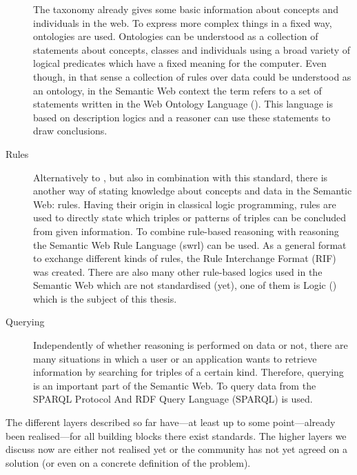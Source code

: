\begin{description}
 The taxonomy already gives some basic information about concepts and individuals in the web. To express more complex things in a fixed way, ontologies are used. 
 Ontologies can be understood as a collection of statements about concepts, classes and individuals using a broad variety of logical predicates which have a fixed meaning for the computer.
 Even though, in that sense a collection of rules over \rdf data could be understood as an ontology,  in the Semantic Web context the term refers to a set of statements written in the Web 
 Ontology Language (\owl). This language is based on description logics and a reasoner can use these statements to draw conclusions.
 \item[Rules] Alternatively to \owl, but also in combination with this standard, there is another way of stating knowledge about concepts and data in the Semantic Web: rules. 
 Having their origin in classical logic programming, rules are used to directly state which triples or patterns of triples can be concluded from given information. To combine rule-based reasoning 
 with \owl reasoning the Semantic Web Rule Language (swrl) can be used. As a general format to exchange different kinds of rules, the Rule Interchange Format (RIF) was created. 
 There are also many other 
 rule-based logics used in the Semantic Web which are not standardised (yet), one of them is \notationthree Logic (\nthreelogic) 
 which is the subject of this thesis.
 \item[Querying] Independently of whether reasoning is performed on \rdf data or not, there are many situations in which a user or an application wants to retrieve information 
 by searching for triples of a certain kind. Therefore, querying is an important part of the Semantic Web. To query data from \rdf the SPARQL Protocol And RDF Query Language (SPARQL) is used.
 \end{description}
 The different layers described so far have---at least up to some point---already been realised---for all building blocks there exist standards. 
 The higher layers we discuss now
are either not realised yet or the community has not yet agreed on a solution (or even on a concrete definition of the problem). 
